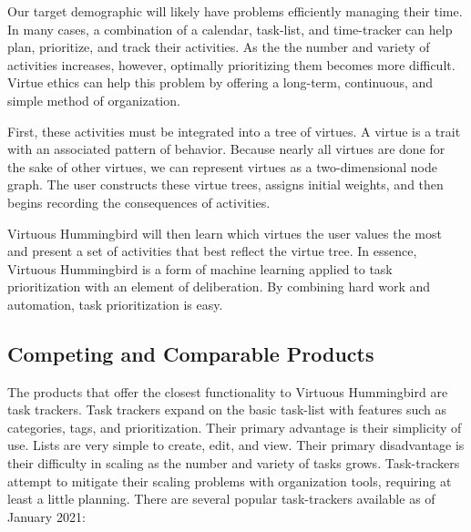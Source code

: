 \documentclass{article}
\begin{document}
Our target demographic will likely have problems efficiently managing their time.
In many cases, a combination of a calendar, task-list, and time-tracker can help plan, prioritize, and track their activities.
As the the number and variety of activities increases, however, optimally prioritizing them becomes more difficult.
Virtue ethics can help this problem by offering a long-term, continuous, and simple method of organization.

First, these activities must be integrated into a tree of virtues.
A virtue is a trait with an associated pattern of behavior.
Because nearly all virtues are done for the sake of other virtues, we can represent virtues as a two-dimensional node graph.
The user constructs these virtue trees, assigns initial weights, and then begins recording the consequences of activities.

Virtuous Hummingbird will then learn which virtues the user values the most and present a set of activities that best reflect the virtue tree.
In essence, Virtuous Hummingbird is a form of machine learning applied to task prioritization with an element of deliberation.
By combining hard work and automation, task prioritization is easy.

\subsection{Competing and Comparable Products}

The products that offer the closest functionality to Virtuous Hummingbird are task trackers.
Task trackers expand on the basic task-list with features such as categories, tags, and prioritization.
Their primary advantage is their simplicity of use.
Lists are very simple to create, edit, and view.
Their primary disadvantage is their difficulty in scaling as the number and variety of tasks grows.
Task-trackers attempt to mitigate their scaling problems with organization tools, requiring at least a little planning.
There are several popular task-trackers available as of January 2021:
\end{document}
